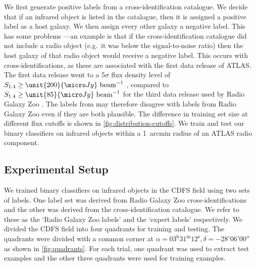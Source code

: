 \documentclass[11pt, a4paper]{book}
\newcommand{\jansky}{Jy}
\begin{document}
    We first generate positive labels from a cross-identification catalogue.
    We decide that if an infrared object is listed in the catalogue, then it
    is assigned a positive label as a host galaxy. We then assign every other galaxy a negative label. This has some problems
   ---an example is that if the cross-identification catalogue did not include a radio
    object (e.g.~it was below the signal-to-noise ratio) then the host galaxy
    of that radio object would receive a negative label. This occurs with
    \citet{norris06} cross-identifications, as these are associated with the
    first data release of ATLAS. The first data release went to a 5$\sigma$
    flux density level of $S_{1.4} \geq \unit{200}{\micro\jansky}\text{
    beam}^{-1}$ \citep{norris06}, compared to $S_{1.4} \geq \unit{85}{\micro\jansky}\text{
    beam}^{-1}$ for the third data release used by Radio Galaxy Zoo
    \citep{franzen15}. The labels from \citet{norris06} may therefore disagree with labels
    from Radio Galaxy Zoo even if they are both plausible. The difference in
    training set size at different flux cutoffs is shown in
    \autoref{fig:distribution-cutoffs}. We train and test our binary
    classifiers on infrared objects within a 1~arcmin radius of an ATLAS radio
    component.

  \subsection{Experimental Setup}
  \label{sec:atlas-xid-experimental-setup}

    We trained binary classifiers on infrared objects in the CDFS field using
    two sets of labels. One label set was derived from Radio Galaxy Zoo
    cross-identifications and the other was derived from the \citet{norris06}
    cross-identification catalogue. We refer to these as the `Radio Galaxy Zoo
    labels' and the `expert labels' respectively. We divided the CDFS field
    into four quadrants for training and testing. The quadrants were divided
    with a common corner at $\alpha = 03^\text{h}31^\text{m}12^\text{s},
    \delta = -28^\circ{}06'00''$ as shown in \autoref{fig:quadrants}. For
    each trial, one quadrant was used to extract test examples and the other
    three quadrants were used for training examples.
\end{document}
